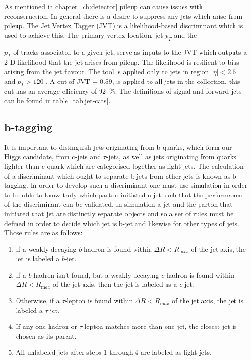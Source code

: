As mentioned in chapter~\ref{ch:detector} pileup can cause issues with
reconstruction. In general there is a desire to suppress any jets which arise
from pileup. The Jet Vertex Tagger (JVT) is a likelihood-based discriminant
which is used to achieve this. The primary vertex location, jet $p_T$ and the

$p_T$ of tracks associated to a given jet, serve as inputs to the JVT which
outputs a 2-D likelihood that the jet arises from pileup. The likelihood is
resilient to bias arising from the jet flavour. The tool is applied only to jets
in region $\lvert  \eta \rvert < 2.5$ and $p_T > 120$ \GeV. A cut of JVT = 0.59,
is applied to all jets in the collection, this cut has an average efficiency of
92~\%. The definitions of signal and forward jets can be found in
table~\ref{tab:jet-cats}.


\subsection{b-tagging}
\label{sec:btagging}

It is important to distinguish jets originating from b-quarks, which form our
Higgs candidate, from c-jets and $\tau$-jets, as well as jets originating from
quarks lighter than c-quark which are categorised together as light-jets. The
calculation of a discriminant which ought to separate b-jets from other jets is
known as b-tagging. In order to develop such a discriminant one must use
simulation in order to be able to know truly which parton initiated a jet such
that the performance of the discriminant can be validated. In simulation a jet
and the parton that initiated that jet are distinctly separate objects and so a
set of rules must be defined in order to decide which jet is b-jet and likewise
for other types of jets. Those rules are as follows:
\begin{enumerate}
\item  If a weakly decaying $b$-hadron is found within $\Delta R<R_{\mathrm max}$ of the
  jet axis, the jet is labeled a $b$-jet.
\item  If a $b$-hadron isn't found, but a weakly decaying $c$-hadron is
  found within $\Delta R<R_{\mathrm max}$ of the jet axis, then the jet is labeled as a $c$-jet.
\item  Otherwise, if a $\tau$-lepton is found within
  $\Delta R<R_{\mathrm max}$ of the jet axis, the jet is labeled a $\tau$-jet.
\item If any one hadron or $\tau$-lepton matches more than one jet, the closest jet
  is chosen as its parent.
\item All unlabeled jets after steps 1 through 4 are labeled as light-jets.
\end{enumerate}

